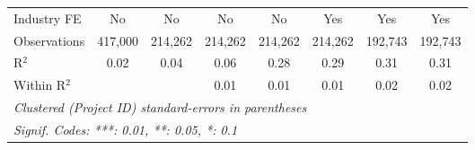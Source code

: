 \documentclass[
]{article}
\begin{document}
\begin{tabular}{lccccccc}
   Industry FE                         & No             & No             & No            & No            & Yes           & Yes           & Yes\\  
   Observations                        & 417,000        & 214,262        & 214,262       & 214,262       & 214,262       & 192,743       & 192,743\\  
   R$^2$                               & 0.02           & 0.04           & 0.06          & 0.28          & 0.29          & 0.31          & 0.31\\  
   Within R$^2$                        &                &                & 0.01          & 0.01          & 0.01          & 0.02          & 0.02\\  
   \midrule
   \multicolumn{8}{l}{\emph{Clustered (Project ID) standard-errors in parentheses}}\\
   \multicolumn{8}{l}{\emph{Signif. Codes: ***: 0.01, **: 0.05, *: 0.1}}\\
\end{tabular}
\par\endgroup
\begingroup
\centering
\small
\end{document}

